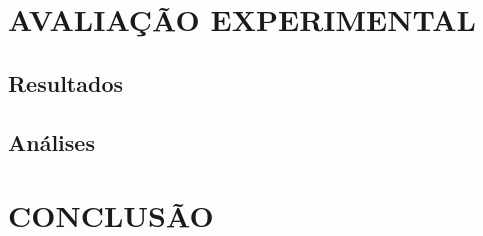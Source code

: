\documentclass[12pt]{article}
\begin{document}
\section{AVALIAÇÃO EXPERIMENTAL}
\label{avaliacao_experimental}

\subsection{Resultados}

\subsection{Análises}

\section{CONCLUSÃO}
\label{conclusao}
\end{document}
